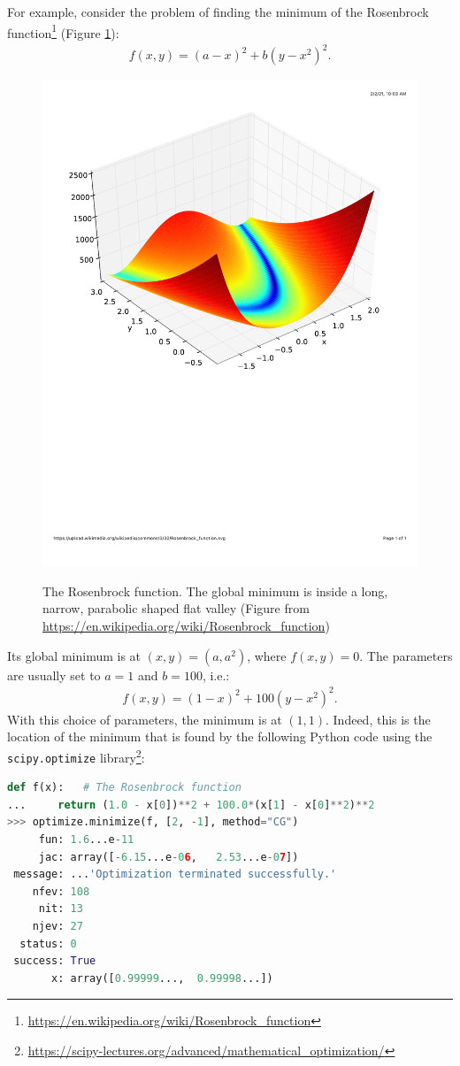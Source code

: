 \documentclass[12pt,letter]{article}
\begin{document}
 For example, consider the problem of finding the minimum of the Rosenbrock function\footnote{\url{https://en.wikipedia.org/wiki/Rosenbrock_function}} (Figure \ref{fig_rosenbrock}): 
\begin{align}
f(x,y) = (a-x)^2 + b(y-x^2)^2.
\label{rosenbrock}
\end{align}
\begin{figure}[H]
	\begin{center}
		{\includegraphics[width=.50\textwidth]{figs/rosenbrock}}
	\end{center}
	\caption{The Rosenbrock function. The global minimum is inside a long, narrow, parabolic shaped flat valley (Figure from \url{https://en.wikipedia.org/wiki/Rosenbrock_function})}
	\label{fig_rosenbrock}
\end{figure}

Its global minimum is at $(x,y) = (a,a^2)$, where $f(x,y)=0$. The parameters are usually set to $a=1$ and $b=100$, i.e.: 
\begin{align}
f(x,y) = (1-x)^2 + 100(y-x^2)^2.
\end{align}
With this choice of parameters, the minimum is at $(1,1)$. Indeed, this is the location of the minimum that is found by the following Python code using the {\tt scipy.optimize} library\footnote{\url{https://scipy-lectures.org/advanced/mathematical_optimization/}}: 

\begin{lstlisting}[language=Python]
def f(x):   # The Rosenbrock function
...     return (1.0 - x[0])**2 + 100.0*(x[1] - x[0]**2)**2
>>> optimize.minimize(f, [2, -1], method="CG")    
     fun: 1.6...e-11
     jac: array([-6.15...e-06,   2.53...e-07])
 message: ...'Optimization terminated successfully.'
    nfev: 108
     nit: 13
    njev: 27
  status: 0
 success: True
       x: array([0.99999...,  0.99998...])
\end{lstlisting}
\end{document}
